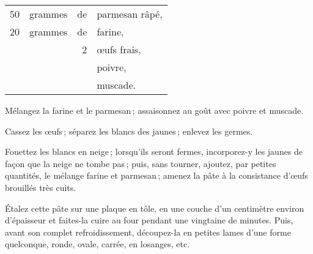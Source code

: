\footnotesize
\begin{longtable}{rrrp{16em}}                                                    
     50 & grammes & de & parmesan râpé,                                                                   \\
     20 & grammes & de & farine,                                                                          \\
        &         &  2 & œufs frais,                                                                      \\
        &         &    & poivre,                                                                          \\
        &         &    & muscade.                                                                         \\
\end{longtable}
\normalsize

Mélangez la farine et le parmesan ; assaisonnez au goût avec poivre et muscade.

Cassez les œufs ; séparez les blancs des jaunes ; enlevez les germes.

Fouettez les blancs en neige ; lorsqu'ils seront fermes, incorporez-y les
jaunes de façon que la neige ne tombe pas ; puis, sans tourner, ajoutez, par
petites quantités, le mélange farine et parmesan ; amenez la pâte à la
consistance d'œufs brouillés très cuits.

Étalez cette pâte sur une plaque en tôle, en une couche d'un centimètre environ
d'épaisseur et faites-la cuire au four pendant une vingtaine de minutes. Puis,
avant son complet refroidissement, découpez-la en petites lames d'une forme
quelconque, ronde, ovale, carrée, en losanges, etc.

